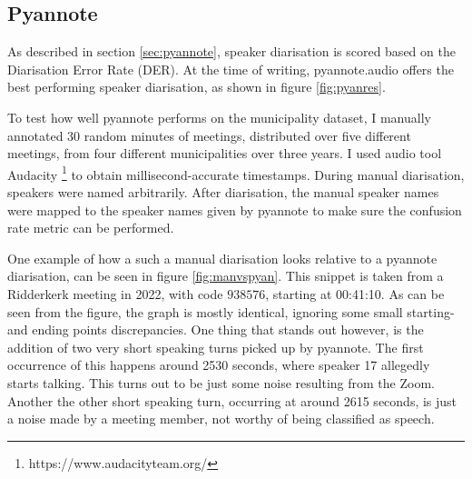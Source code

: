 \documentclass[twoside]{uva-inf-bachelor-thesis}
\begin{document}
\subsection{Pyannote}\label{sec:pyanExp}
As described in section \ref{sec:pyannote}, speaker diarisation is scored based on the Diarisation Error Rate (DER). At the time of writing, pyannote.audio offers the best performing speaker diarisation, as shown in figure \ref{fig:pyanres}. 

To test how well pyannote performs on the municipality dataset, I manually annotated 30 random minutes of meetings, distributed over five different meetings, from four different municipalities over three years. I used audio tool Audacity \footnote{https://www.audacityteam.org/} to obtain millisecond-accurate timestamps. During manual diarisation, speakers were named arbitrarily. After diarisation, the manual speaker names were mapped to the speaker names given by pyannote to make sure the confusion rate metric can be performed.

One example of how a such a manual diarisation looks relative to a pyannote diarisation, can be seen in figure \ref{fig:manvspyan}. This snippet is taken from a Ridderkerk meeting in 2022, with code $938576$, starting at 00:41:10. As can be seen from the figure, the graph is mostly identical, ignoring some small starting- and ending points discrepancies. 
One thing that stands out however, is the addition of two very short speaking turns picked up by pyannote. The first occurrence of this happens around 2530 seconds, where speaker 17 allegedly starts talking. This turns out to be just some noise resulting from the Zoom. Another the other short speaking turn, occurring at around 2615 seconds, is just a noise made by a meeting member, not worthy of being classified as speech. 
\end{document}
